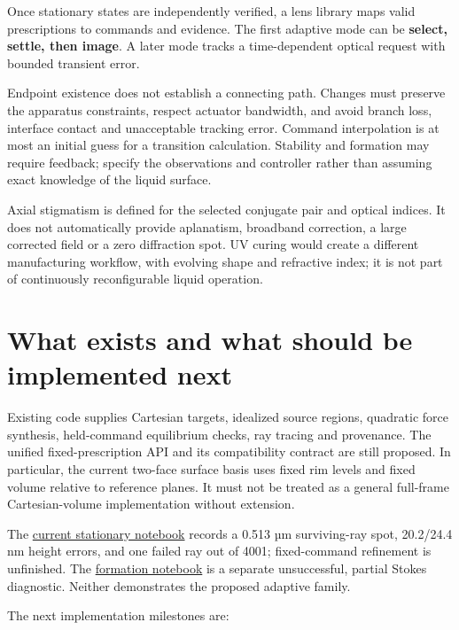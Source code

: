 Once stationary states are independently verified, a lens library maps
valid prescriptions to commands and evidence. The first adaptive mode
can be \textbf{select, settle, then image}. A later mode tracks a
time-dependent optical request with bounded transient error.

Endpoint existence does not establish a connecting path. Changes must
preserve the apparatus constraints, respect actuator bandwidth, and
avoid branch loss, interface contact and unacceptable tracking error.
Command interpolation is at most an initial guess for a transition
calculation. Stability and formation may require feedback; specify the
observations and controller rather than assuming exact knowledge of the
liquid surface.

Axial stigmatism is defined for the selected conjugate pair and optical
indices. It does not automatically provide aplanatism, broadband
correction, a large corrected field or a zero diffraction spot. UV
curing would create a different manufacturing workflow, with evolving
shape and refractive index; it is not part of continuously
reconfigurable liquid operation.

\section{What exists and what should be implemented next}\label{what-exists-and-what-should-be-implemented-next}

Existing code supplies Cartesian targets, idealized source regions,
quadratic force synthesis, held-command equilibrium checks, ray tracing
and provenance. The unified fixed-prescription API and its compatibility
contract are still proposed. In particular, the current two-face surface
basis uses fixed rim levels and fixed volume relative to reference
planes. It must not be treated as a general full-frame Cartesian-volume
implementation without extension.

The
\href{../../docs/../artifacts/studies/S04-emitter-synthesis/notebooks/09_emitter_driven_equilibrium.executed.ipynb}{current
stationary notebook} records a 0.513 µm surviving-ray spot, 20.2/24.4 nm
height errors, and one failed ray out of 4001; fixed-command refinement
is unfinished. The
\href{../../docs/../artifacts/studies/S05-emitter-formation/notebooks/10_emitter_formation.executed.ipynb}{formation
notebook} is a separate unsuccessful, partial Stokes diagnostic. Neither
demonstrates the proposed adaptive family.

The next implementation milestones are:

